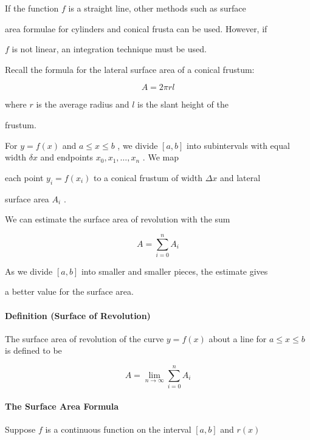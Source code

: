 If the function $f$ is a straight line, other methods such as surface

area formulae for cylinders and conical frusta can be used. However, if

$f$ is not linear, an integration technique must be used.



Recall the formula for the lateral surface area of a conical frustum:



$$A=2\pi rl$$



where $r$ is the average radius and $l$ is the slant height of the

frustum.



For $y=f(x)$ and $a\le x\le b$ , we divide $[a,b]$ into subintervals with equal width $\delta x$ and endpoints $x _0,x _1,\ldots,x _n$ . We map

each point $y _i=f(x _i)$ to a conical frustum of width $\Delta x$ and lateral

surface area $A _i$ .



We can estimate the surface area of revolution with the sum



$$A=\sum _{i=0}^n A _i$$



As we divide $[a,b]$ into smaller and smaller pieces, the estimate gives

a better value for the surface area.



\paragraph{Definition (Surface of Revolution)}



The surface area of revolution of the curve $y=f(x)$ about a line for $a\le x\le b$ is defined to be



$$A=\lim _{n\to\infty}\sum _{i=0}^n A _i$$



\paragraph{The Surface Area Formula}



Suppose $f$ is a continuous function on the interval $[a,b]$ and $r(x)$

